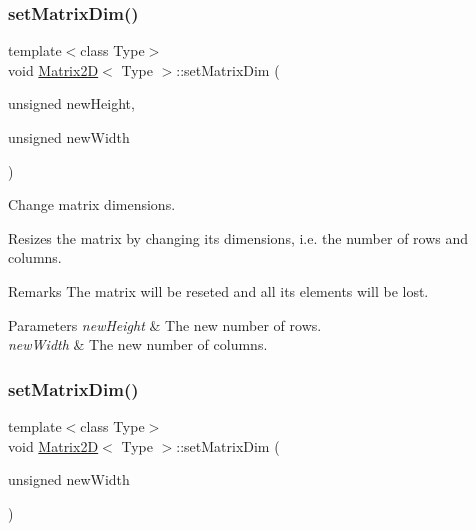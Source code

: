 \subsubsection{\texorpdfstring{set\+Matrix\+Dim()}{setMatrixDim()}\hspace{0.1cm}{\footnotesize\ttfamily [1/2]}}
{\footnotesize\ttfamily template$<$class Type$>$ \\
void \mbox{\hyperlink{classMatrix2D}{Matrix2D}}$<$ Type $>$\+::set\+Matrix\+Dim (\begin{DoxyParamCaption}\item[{unsigned}]{new\+Height,  }\item[{unsigned}]{new\+Width }\end{DoxyParamCaption})\hspace{0.3cm}{\ttfamily [inline]}}



Change matrix dimensions. 

Resizes the matrix by changing its dimensions, i.\+e. the number of rows and columns. \begin{DoxyRemark}{Remarks}
The matrix will be reseted and all its elements will be lost. 
\end{DoxyRemark}

\begin{DoxyParams}{Parameters}
{\em new\+Height} & The new number of rows. \\
\hline
{\em new\+Width} & The new number of columns. \\
\hline
\end{DoxyParams}
\mbox{\label{classMatrix2D_a02d8df2be95d08423b44009ffe01c12f}} 
\subsubsection{\texorpdfstring{set\+Matrix\+Dim()}{setMatrixDim()}\hspace{0.1cm}{\footnotesize\ttfamily [2/2]}}
{\footnotesize\ttfamily template$<$class Type$>$ \\
void \mbox{\hyperlink{classMatrix2D}{Matrix2D}}$<$ Type $>$\+::set\+Matrix\+Dim (\begin{DoxyParamCaption}\item[{unsigned}]{new\+Width }\end{DoxyParamCaption})\hspace{0.3cm}{\ttfamily [inline]}}



